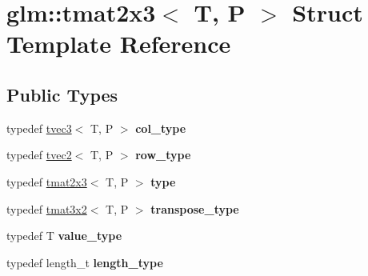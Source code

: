 \hypertarget{structglm_1_1tmat2x3}{}\section{glm\+:\+:tmat2x3$<$ T, P $>$ Struct Template Reference}
\label{structglm_1_1tmat2x3}
\subsection*{Public Types}
\begin{DoxyCompactItemize}
\item 
\mbox{\label{structglm_1_1tmat2x3_a62523fc3d245c37e15d68c3b9729f366}} 
typedef \hyperlink{structglm_1_1tvec3}{tvec3}$<$ T, P $>$ {\bfseries col\+\_\+type}
\item 
\mbox{\label{structglm_1_1tmat2x3_a0cce885b1659b852ff0290413ce02238}} 
typedef \hyperlink{structglm_1_1tvec2}{tvec2}$<$ T, P $>$ {\bfseries row\+\_\+type}
\item 
\mbox{\label{structglm_1_1tmat2x3_af35f08ee62979a5e377b5f5262c57937}} 
typedef \hyperlink{structglm_1_1tmat2x3}{tmat2x3}$<$ T, P $>$ {\bfseries type}
\item 
\mbox{\label{structglm_1_1tmat2x3_adade07dec727cac2e2463d8c765f133d}} 
typedef \hyperlink{structglm_1_1tmat3x2}{tmat3x2}$<$ T, P $>$ {\bfseries transpose\+\_\+type}
\item 
\mbox{\label{structglm_1_1tmat2x3_a73172253a573f98aa06474e043cc03af}} 
typedef T {\bfseries value\+\_\+type}
\item 
\mbox{\label{structglm_1_1tmat2x3_a25be85bf523cf3daa1c2b6b00ad45c82}} 
typedef length\+\_\+t {\bfseries length\+\_\+type}
\end{DoxyCompactItemize}

